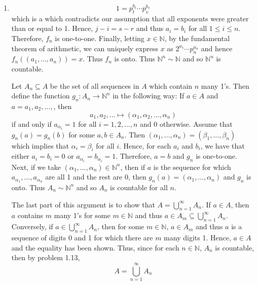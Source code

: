 \documentclass[12pt]{article}
\makeatletter
\theoremstyle{definition}
\theoremstyle{remark}
\renewenvironment{proof}[1][\proofname]{\par
  \pushQED{\qed}%
  \normalfont \topsep6\p@\@plus6\p@\relax
  \list{}{\leftmargin=0mm
          \rightmargin=4mm
          \settowidth{\itemindent}{\itshape#1}%
          \labelwidth=\itemindent
          \parsep=0pt \listparindent=\parindent 
  }
  \item[\hskip\labelsep
        \itshape
    #1\@addpunct{.}]\ignorespaces
}{%
  \popQED\endlist\@endpefalse
}
\let\oldproofname=\proofname
\renewcommand{\proofname}{\bf{\textit{\oldproofname}}}
\makeatother
\begin{document}
\begin{enumerate}[leftmargin=*]
\begin{proof}
                    \begin{equation*}
                        1=p_t^{b_t}\cdots p_v^{b_v}
                    \end{equation*}
                which is a which contradicts our assumption that all exponents were greater than or equal to 1. Hence, $j-i=s-r$ and thus $a_i=b_i$ for all $1\leq i\leq n$. Therefore, $f_n$ is one-to-one. Finally, letting $x\in\mathbb{N}$, by the fundamental theorem of arithmetic, we can uniquely express $x$ as $2^{a_1}\cdots p_n^{a_n}$ and hence $f_n((a_1,\dots,a_n))=x$. Thus $f_n$ is onto. Thus $\mathbb{N}^n\sim\mathbb{N}$ and so $\mathbb{N}^n$ is countable.\par\hspace{4mm} Let $A_n\subseteq A$ be the set of all sequences in $A$ which contain $n$ many 1's. Then define the function $g_n\colon A_n\rightarrow\mathbb{N}^n$ in the following way: If $a\in A$ and $a=a_1,a_2,\dots,$, then 
                    \begin{equation*}
                        a_1,a_2,\dots\mapsto(\alpha_1,\alpha_2,\dots,\alpha_n)
                    \end{equation*}
                if and only if $a_{\alpha_i}=1$ for all $i=1,2,\dots,n$ and 0 otherwise. Assume that $g_n(a)=g_n(b)$ for some $a,b\in A_n$. Then $(\alpha_1,\dots,\alpha_n)=(\beta_1,\dots,\beta_n)$ which implies that $\alpha_i=\beta_i$ for all $i$. Hence, for each $a_i$ and $b_i$, we have that either $a_i=b_i=0$ or $a_{\alpha_i}=b_{\alpha_i}=1$. Therefore, $a=b$ and $g_n$ is one-to-one. Next, if we take $(\alpha_1,\dots,\alpha_n)\in \mathbb{N}^n$, then if $a$ is the sequence for which $a_{\alpha_1},\dots,a_{\alpha_n}$ are all 1 and the rest are 0, then $g_n(a)=(\alpha_1,\dots,\alpha_n)$ and $g_n$ is onto. Thus $A_n\sim\mathbb{N}^n$ and so $A_n$ is countable for all $n$.\par\hspace{4mm} The last part of this argument is to show that $A=\bigcup_{n=1}^{\infty}A_n$. If $a\in A$, then $a$ contains $m$ many 1's for some $m\in\mathbb{N}$ and thus $a\in A_m\subseteq\bigcup_{n=1}^{\infty} A_n$. Conversely, if $a\in\bigcup_{n=1}^{\infty}A_n$, then for some $m\in\mathbb{N}$, $a\in A_m$ and thus $a$ is a sequence of digits 0 and 1 for which there are $m$ many digits 1. Hence, $a\in A$ and the equality has been shown. Thus, since for each $n\in\mathbb{N}$, $A_n$ is countable, then by problem 1.13, 
                    \begin{equation*}
                        A=\bigcup_{n=1}^{\infty} A_n

\end{equation*}
\end{proof}
\end{enumerate}
\end{document}
